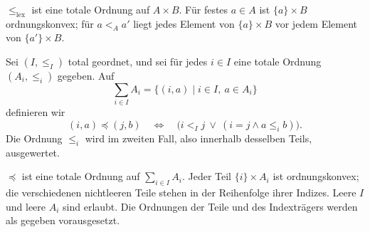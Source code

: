 \begin{theorem}
\label{b15guide:thm:lex}
$\leq_{\mathrm{lex}}$ ist eine totale Ordnung auf $A\times B$.
Für festes $a\in A$ ist $\{a\}\times B$ ordnungskonvex;
für $a<_A a'$ liegt jedes Element von $\{a\}\times B$
vor jedem Element von $\{a'\}\times B$.
\end{theorem}

\begin{definition}
\label{b15guide:def:indexed-sum}
Sei $(I,\leq_I)$ total geordnet, und sei für jedes $i\in I$
eine totale Ordnung $(A_i,\leq_i)$ gegeben. Auf
\[
 \sum_{i\in I}A_i=\{(i,a)\mid i\in I,\ a\in A_i\}
\]
definieren wir
\[
 (i,a)\preceq(j,b)
 \quad\Longleftrightarrow\quad
 \bigl(i<_I j\ \lor\ (i=j\land a\leq_i b)\bigr).
\]
Die Ordnung $\leq_i$ wird im zweiten Fall, also innerhalb
desselben Teils, ausgewertet.
\end{definition}

\begin{theorem}
\label{b15guide:thm:indexed-sum}
$\preceq$ ist eine totale Ordnung auf $\sum_{i\in I}A_i$.
Jeder Teil $\{i\}\times A_i$ ist ordnungskonvex;
die verschiedenen nichtleeren Teile stehen in der Reihenfolge
ihrer Indizes. Leere $I$ und leere $A_i$ sind erlaubt.
Die Ordnungen der Teile und des Indexträgers werden als gegeben
vorausgesetzt.
\end{theorem}
